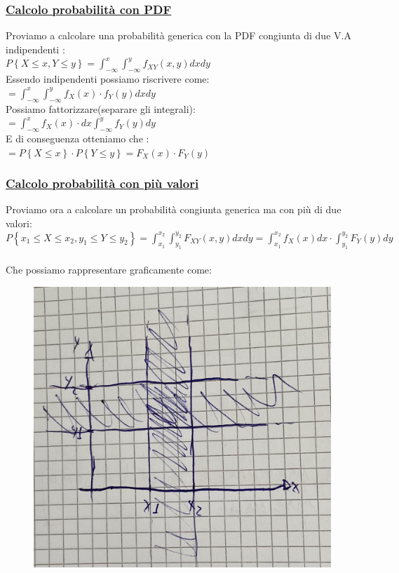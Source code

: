 \documentclass{article}
\begin{document}
\subsubsection{\underline{Calcolo probabilità con PDF}}
Proviamo a calcolare una probabilità generica con la PDF congiunta di due V.A indipendenti : \\
$P\left\{ X \leq x, Y \leq y \right\} = \int_{-\infty}^{x} \int_{-\infty}^{y} f_{XY}(x,y) dx dy$ \\
Essendo indipendenti possiamo riscrivere come: \\
$= \int_{-\infty}^{x} \int_{-\infty}^{y} f_X(x) \cdot f_Y(y) dx dy$ \\
Possiamo fattorizzare(separare gli integrali): \\
$= \int_{-\infty}^{x} f_X(x) \cdot dx \int_{-\infty}^{y}f_Y(y) dy$ \\
E di conseguenza otteniamo che : \\
$= P\left\{ X \leq x\right\} \cdot P\left\{ Y \leq y\right\} = F_X(x) \cdot F_Y(y)$
\subsubsection{\underline{Calcolo probabilità con più valori}}
Proviamo ora a calcolare un probabilità congiunta generica ma con più di due valori: \\
$P\left\{ x_1 \leq X \leq x_2, y_1 \leq Y \leq y_2 \right\} = \int_{x_1}^{x_2} \int_{y_1}^{y_2} F_{XY}(x,y) dx dy = \int_{x_1}^{x_2} f_X(x) dx \cdot \int_{y_1}^{y_2} F_Y(y) dy$ \\ \\
Che possiamo rappresentare graficamente come:
\begin{figure}[ht]
\centering
\includegraphics[scale=0.14]{images/80.jpeg}
\end{figure} 
\end{document}
